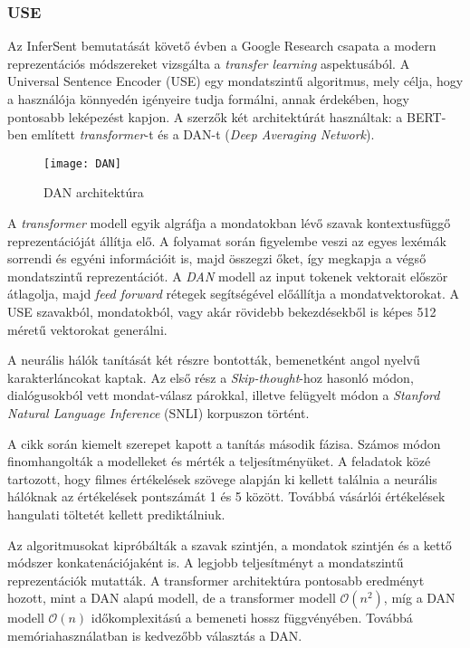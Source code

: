 \subsubsection{USE}
Az InferSent bemutatását követő évben a Google Research csapata a modern reprezentációs módszereket vizsgálta a \textit{transfer learning} aspektusából. A Universal Sentence Encoder (USE) egy mondatszintű  algoritmus, mely célja, hogy a használója könnyedén igényeire tudja formálni, annak érdekében, hogy pontosabb leképezést kapjon. A szerzők két architektúrát használtak: a BERT-ben említett \textit{transformer}-t és a DAN-t (\textit{Deep Averaging Network}). 

\begin{figure}[H]
	\centering
	\texttt{[image: DAN]}
	\caption{DAN architektúra}
\end{figure}

A \textit{transformer} modell egyik algráfja a mondatokban lévő szavak kontextusfüggő reprezentációját állítja elő. A folyamat során figyelembe veszi az egyes lexémák sorrendi és egyéni információit is, majd összegzi őket, így megkapja a végső mondatszintű reprezentációt.
A \textit{DAN} modell az input tokenek vektorait először átlagolja, majd \textit{feed forward} rétegek segítségével előállítja a mondatvektorokat. A USE szavakból, mondatokból, vagy akár rövidebb bekezdésekből is képes 512 méretű vektorokat generálni.

A neurális hálók tanítását két részre bontották, bemenetként angol nyelvű karakterláncokat kaptak. Az első rész a \textit{Skip-thought}-hoz hasonló módon, dialógusokból vett mondat-válasz párokkal, illetve felügyelt módon a \textit{Stanford Natural Language Inference} (SNLI) korpuszon történt.

A cikk során kiemelt szerepet kapott a tanítás második fázisa. Számos módon finomhangolták a modelleket és mérték a teljesítményüket. A feladatok közé tartozott, hogy filmes értékelések szövege alapján ki kellett találnia a neurális hálóknak az értékelések pontszámát 1 és 5 között. Továbbá vásárlói értékelések hangulati töltetét kellett prediktálniuk.

 Az algoritmusokat kipróbálták a szavak szintjén, a mondatok szintjén és a kettő módszer konkatenációjaként is. A legjobb teljesítményt a mondatszintű reprezentációk mutatták. A transformer architektúra pontosabb eredményt hozott, mint a DAN alapú modell, de a transformer modell $\mathcal{O}(n^2)$, míg a DAN modell $\mathcal{O}(n)$ időkomplexitású a bemeneti hossz függvényében. Továbbá memóriahasználatban is kedvezőbb választás a DAN.

